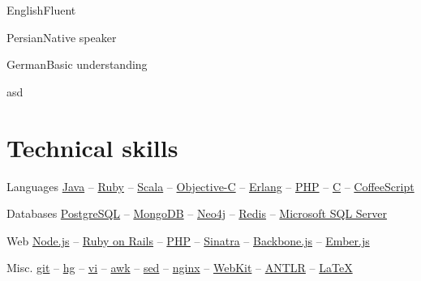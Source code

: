 \documentclass{tccv}
\begin{document}
\begin{factlist}

\item{English}{Fluent}

\item{Persian}{Native speaker}

\item{German}{Basic understanding}

\end{factlist}


\sectionline

asd









\section{Technical skills}

\begin{factlist}

\item{Languages}
     {
     \href{http://www.oracle.com/technetwork/java/}{Java} -- 
     \href{https://www.ruby-lang.org/en/}{Ruby} -- 
     \href{http://www.scala-lang.org}{Scala} -- 
     \href{https://en.wikipedia.org/wiki/Objective-C}{Objective-C} -- 
     \href{http://www.erlang.org}{Erlang} -- 
     \href{http://php.net}{PHP} -- 
     \href{https://en.wikipedia.org/wiki/C_(programming_language)}{C} -- 
     \href{http://coffeescript.org}{CoffeeScript}
     }

\item{Databases}
     {
     \href{http://www.postgresql.org}{PostgreSQL} -- 
     \href{http://www.mongodb.org}{MongoDB} -- 
     \href{http://www.neo4j.org}{Neo4j} -- 
     \href{http://redis.io}{Redis} -- 
     \href{http://www.microsoft.com/en-us/sqlserver/default.aspx}{Microsoft SQL Server}
     }

\item{Web}
     {
     \href{http://nodejs.org}{Node.js} -- 
     \href{http://rubyonrails.org}{Ruby on Rails} -- 
     \href{http://php.net}{PHP} -- 
     \href{http://www.sinatrarb.com}{Sinatra} -- 
     \href{http://backbonejs.org}{Backbone.js} -- 
     \href{http://emberjs.com}{Ember.js}
     }

\item{Misc.}
     {
     \href{http://git-scm.com}{git} -- 
     \href{http://www.selenic.com/mercurial/}{hg} -- 
     \href{http://www.vim.org}{vi} -- 
     \href{http://awk.info}{awk} -- 
     \href{http://www.gnu.org/software/sed/}{sed} -- 
     \href{http://nginx.org/en/}{nginx} -- 
     \href{http://www.webkit.org}{WebKit} -- 
     \href{http://www.antlr.org}{ANTLR} -- 
     \href{http://www.latex-project.org}{\LaTeX}
     }

\end{factlist}
\end{document}
